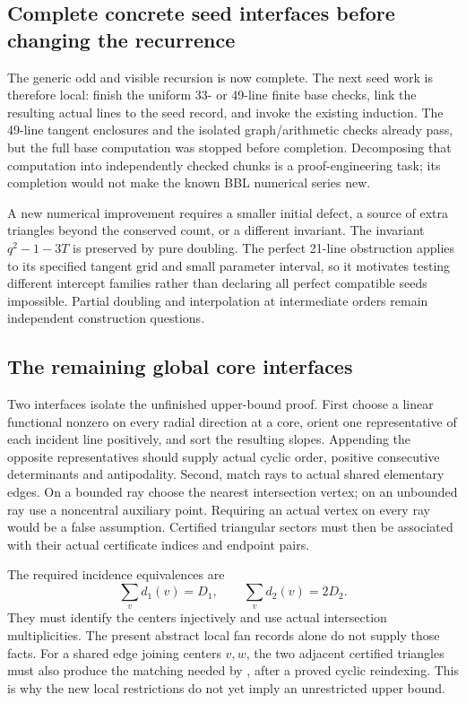 \subsection{Complete concrete seed interfaces before changing the recurrence}

The generic odd and visible recursion is now complete. The next seed
work is therefore local: finish the uniform 33- or 49-line finite base
checks, link the resulting actual lines to the seed record, and invoke
the existing induction. The 49-line tangent enclosures and the isolated
graph/arithmetic checks already pass, but the full base computation was
stopped before completion. Decomposing that computation into independently
checked chunks is a proof-engineering task; its completion would not
make the known BBL numerical series new.

A new numerical improvement requires a smaller initial defect, a source
of extra triangles beyond the conserved count, or a different invariant.
The invariant $q^2-1-3T$ is preserved by pure doubling. The perfect
21-line obstruction applies to its specified tangent grid and small
parameter interval, so it motivates testing different intercept families
rather than declaring all perfect compatible seeds impossible. Partial
doubling and interpolation at intermediate orders remain independent
construction questions.

\subsection{The remaining global core interfaces}

Two interfaces isolate the unfinished upper-bound proof. First choose a
linear functional nonzero on every radial direction at a core, orient
one representative of each incident line positively, and sort the
resulting slopes. Appending the opposite representatives should supply
actual cyclic order, positive consecutive determinants and antipodality.
Second, match rays to actual shared elementary edges. On a bounded ray
choose the nearest intersection vertex; on an unbounded ray use a
noncentral auxiliary point. Requiring an actual vertex on every ray
would be a false assumption. Certified triangular sectors must then be
associated with their actual certificate indices and endpoint pairs.

The required incidence equivalences are
\[
 \sum_v d_1(v)=D_1,\qquad \sum_v d_2(v)=2D_2.
\]
They must identify the centers injectively and use actual intersection
multiplicities. The present abstract local fan records alone do not
supply those facts. For a shared edge joining centers $v,w$, the two
adjacent certified triangles must also produce the matching needed by
, after a proved cyclic reindexing. This is why the
new local restrictions do not yet imply an unrestricted upper bound.

